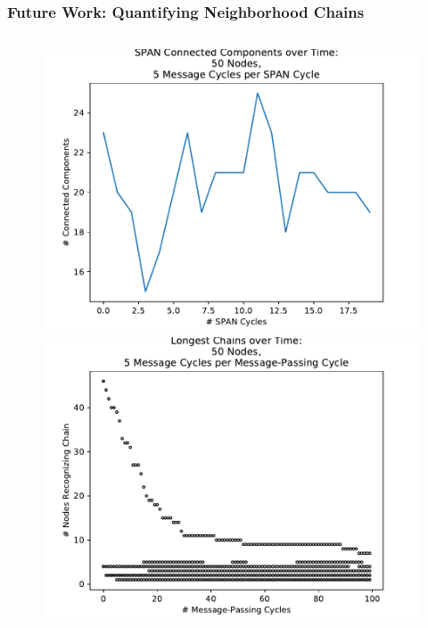 \documentclass{beamer}
\begin{document}
\begin{frame}
	\frametitle{Future Work: Quantifying Neighborhood Chains}

	\begin{columns}
		\begin{column}{0.5\textwidth}
			\centering
			\begin{figure}
				\includegraphics[width=\textwidth]{adj_mat.pdf}
				\includegraphics[width=\textwidth]{longest_chain_hist.pdf}
			\end{figure}
		\end{column}


\end{columns}
\end{frame}
\end{document}
